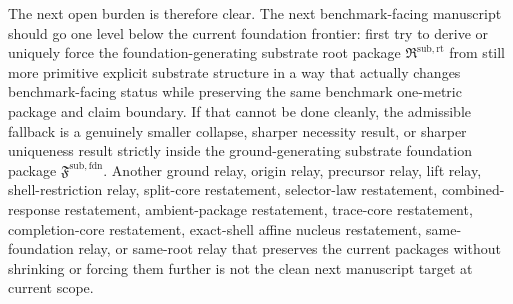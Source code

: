 \documentclass[11pt]{article}
\newcommand{\FoundationPackage}{\mathfrak F^{\mathrm{sub,fdn}}}
\newcommand{\RootPackage}{\mathfrak R^{\mathrm{sub,rt}}}
\begin{document}
The next open burden is therefore clear. The next benchmark-facing manuscript should go one level below the current foundation frontier: first try to derive or uniquely force the foundation-generating substrate root package \(\RootPackage\) from still more primitive explicit substrate structure in a way that actually changes benchmark-facing status while preserving the same benchmark one-metric package and claim boundary. If that cannot be done cleanly, the admissible fallback is a genuinely smaller collapse, sharper necessity result, or sharper uniqueness result strictly inside the ground-generating substrate foundation package \(\FoundationPackage\). Another ground relay, origin relay, precursor relay, lift relay, shell-restriction relay, split-core restatement, selector-law restatement, combined-response restatement, ambient-package restatement, trace-core restatement, completion-core restatement, exact-shell affine nucleus restatement, same-foundation relay, or same-root relay that preserves the current packages without shrinking or forcing them further is not the clean next manuscript target at current scope.
\end{document}
